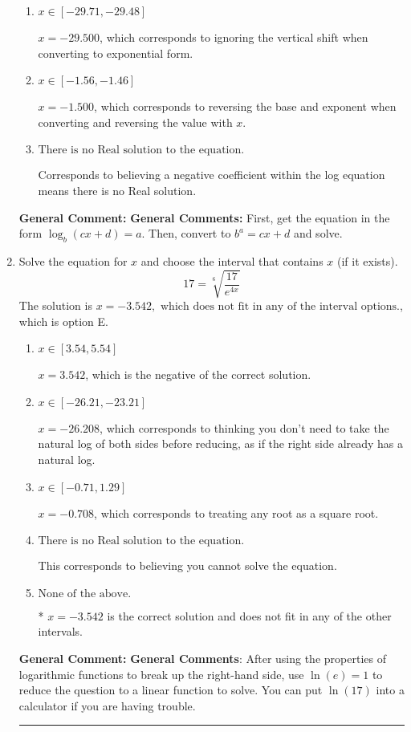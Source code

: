 \documentclass{extbook}[14pt]
\newcommand{\litem}[1]{\item #1

\rule{\textwidth}{0.4pt}}
\begin{document}
\begin{enumerate}
{\begin{enumerate}[label=\Alph*.]
* $x = 1.700$, which is the correct option.
\item \( x \in [-29.71, -29.48] \)

$x = -29.500$, which corresponds to ignoring the vertical shift when converting to exponential form.
\item \( x \in [-1.56, -1.46] \)

$x = -1.500$, which corresponds to reversing the base and exponent when converting and reversing the value with $x$.
\item \( \text{There is no Real solution to the equation.} \)

Corresponds to believing a negative coefficient within the log equation means there is no Real solution.
\end{enumerate}

\textbf{General Comment:} \textbf{General Comments:} First, get the equation in the form $\log_b{(cx+d)} = a$. Then, convert to $b^a = cx+d$ and solve.
}
\litem{
 Solve the equation for $x$ and choose the interval that contains $x$ (if it exists).
\[  17 = \sqrt[6]{\frac{17}{e^{4x}}} \]The solution is \( x = -3.542, \text{ which does not fit in any of the interval options.} \), which is option E.\begin{enumerate}[label=\Alph*.]
\item \( x \in [3.54, 5.54] \)

$x = 3.542$, which is the negative of the correct solution.
\item \( x \in [-26.21, -23.21] \)

$x = -26.208$, which corresponds to thinking you don't need to take the natural log of both sides before reducing, as if the right side already has a natural log.
\item \( x \in [-0.71, 1.29] \)

$x = -0.708$, which corresponds to treating any root as a square root.
\item \( \text{There is no Real solution to the equation.} \)

This corresponds to believing you cannot solve the equation.
\item \( \text{None of the above.} \)

* $x = -3.542$ is the correct solution and does not fit in any of the other intervals.
\end{enumerate}

\textbf{General Comment:} \textbf{General Comments}: After using the properties of logarithmic functions to break up the right-hand side, use $\ln(e) = 1$ to reduce the question to a linear function to solve. You can put $\ln(17)$ into a calculator if you are having trouble.
}
\end{enumerate}
\end{document}
